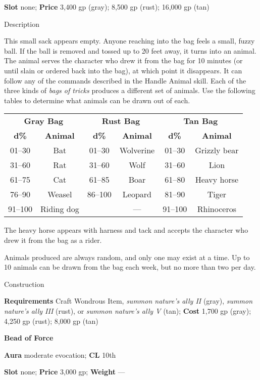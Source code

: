 \textbf{Slot} none; \textbf{Price} 3,400 gp (gray); 8,500 gp (rust); 16,000 gp (tan)
				
Description
				
This small sack appears empty. Anyone reaching into the bag feels a small, fuzzy ball. If the ball is removed and tossed up to 20 feet away, it turns into an animal. The animal serves the character who drew it from the bag for 10 minutes (or until slain or ordered back into the bag), at which point it disappears. It can follow any of the commands described in the Handle Animal skill. Each of the three kinds of \textit{bags of tricks }produces a different set of animals. Use the following tables to determine what animals can be drawn out of each.
				
\setlength{\tabcolsep}{1pt}
\begin{tabular}{cccccc}
\multicolumn{2}{c}{\textbf{Gray Bag}} & \multicolumn{2}{c}{\textbf{Rust Bag}} & \multicolumn{2}{c}{\textbf{Tan Bag}}\\
\textbf{d\%} & \textbf{Animal} & \textbf{d\%} & \textbf{Animal} & \textbf{d\%} & \textbf{Animal}\\
 01--30 & Bat & 01--30 & Wolverine & 01--30 & Grizzly bear\\
 31--60 & Rat & 31--60 & Wolf & 31--60 & Lion\\
 61--75 & Cat & 61--85 & Boar & 61--80 & Heavy horse\\
 76--90 & Weasel & 86--100 & Leopard & 81--90 & Tiger\\
 91--100 & Riding dog & & --- & 91--100 & Rhinoceros\\
\end{tabular}
				
The heavy horse appears with harness and tack and accepts the character who drew it from the bag as a rider.
				
Animals produced are always random, and only one may exist at a time. Up to 10 animals can be drawn from the bag each week, but no more than two per day.
				
Construction
				
\textbf{Requirements }Craft Wondrous Item, \textit{summon nature's ally II }(gray), \textit{summon nature's ally III }(rust), or \textit{summon nature's ally V} (tan); \textbf{Cost} 1,700 gp (gray); 4,250 gp (rust); 8,000 gp (tan)
				
\textbf{Bead of Force}
				
\textbf{Aura} moderate evocation;\textbf{ CL }10th
				
\textbf{Slot} none; \textbf{Price} 3,000 gp; \textbf{Weight} ---
				
